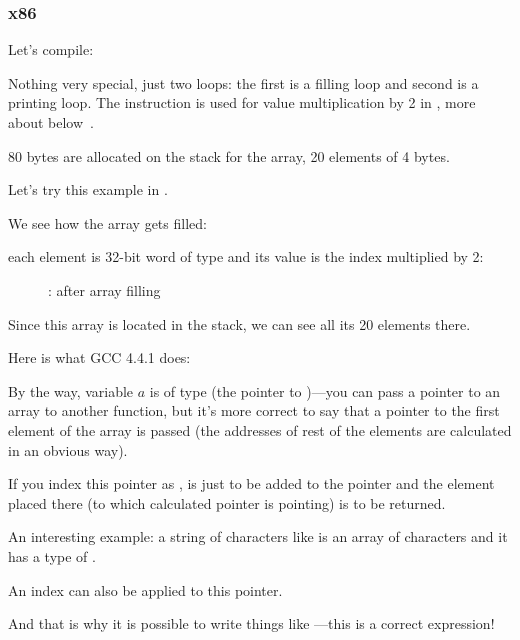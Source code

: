 \subsubsection{x86}


Let's compile:




Nothing very special, just two loops: the first is a filling loop and second is a printing loop.
The  instruction is used for value multiplication by 2 in \ECX, more about below~.

80 bytes are allocated on the stack for the array, 20 elements of 4 bytes.

\clearpage
Let's try this example in \olly.
\myindex{\olly}

We see how the array gets filled: 

each element is 32-bit word of \Tint type and its value is the index multiplied by 2:

\begin{figure}[H]
\centering
{}
\caption{\olly: after array filling}
\label{fig:array_simple_olly}
\end{figure}

Since this array is located in the stack, we can see all its 20 elements there.


Here is what GCC 4.4.1 does:



By the way, variable $a$ is of type   
(the pointer to \Tint{})---you can pass a pointer to an array to another function,
but it's more correct to say that a pointer to the first element of the array is passed
(the addresses of rest of the elements are calculated in an obvious way).

If you index this pointer as ,  is just to be added to the pointer 
and the element placed there (to which calculated pointer is pointing) is to be returned.

An interesting example: a string of characters like 
 is an array of characters and it has a type of .

An index can also be applied to this pointer.

And that is why it is possible to write things like ---this is a correct \CCpp expression!

